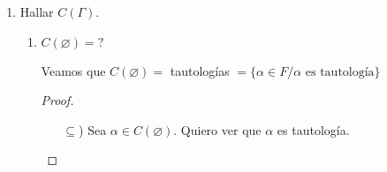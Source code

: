 \begin{enumerate}
\begin{enumerate}
\begin{proof}
            Por otra parte,
            \begin{gather*}
                \dashbox{$v_f(p_3) = f(p_3) = 0$}
            \end{gather*}

            Entonces 
            \begin{gather*}
                \boxed{\alpha \notin C(\Gamma)}
            \end{gather*}

        \end{proof}


    \item $\Gamma = \{ p_1, p_2 \}$, $\alpha = \neg p_1$

        Veamos que $\alpha \notin C(\Gamma)$

        \begin{proof} \phantom{.}
        
            Defino $f: \mathrm{VAR}\to \{ 0,1 \}/ f(p_j) = 1$.

            Sea $v_f$ la valuación que extiende a $f$.

            \begin{gather*}
                v_f(p_1)=1 \wedge v_f(p_2) = 1 \implies v_f(\Gamma)=1
            \end{gather*}

            Pero $v_f(\alpha) = 1 - v_f(p_1) = 0$

            \begin{gather*}
                \boxed{\therefore ~ \alpha \notin C(\Gamma)}
            \end{gather*}
        \end{proof}
        
\end{enumerate}

\item Hallar $C(\Gamma)$.

\begin{enumerate}
    \item $C(\varnothing) = ?$

        Veamos que $C(\varnothing) = $ tautologías 
        $= \{ \alpha\in F /\alpha \text{ es tautología} \}$

        \begin{proof} \phantom{.}
        
            \begin{itemize}
                \item[$\subseteq$)] Sea $\alpha \in C(\varnothing)$.
                    Quiero ver que $\alpha$ es tautología.


\end{itemize}
\end{proof}
\end{enumerate}
\end{enumerate}
